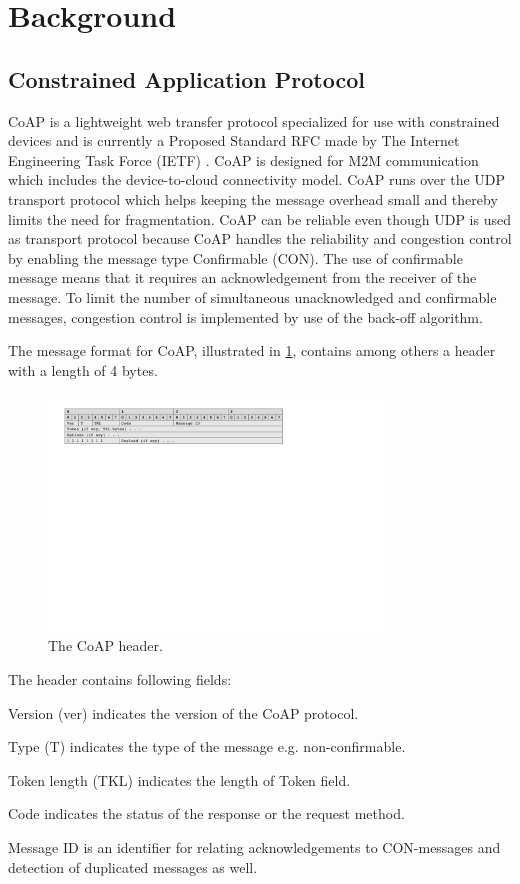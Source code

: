 \section{Background}\label{sec:background}

\subsection{Constrained Application Protocol}
CoAP is a lightweight web transfer protocol specialized for use with constrained devices and is currently a Proposed Standard RFC made by The Internet Engineering Task Force (IETF) \cite{Inter93:online}. CoAP is designed for M2M communication which includes the device-to-cloud connectivity model.
CoAP runs over the UDP transport protocol which helps keeping the message overhead small and thereby limits the need for fragmentation.
CoAP can be reliable even though UDP is used as transport protocol because CoAP handles the reliability and congestion control by enabling the message type Confirmable (CON). 
The use of confirmable message means that it requires an acknowledgement from the receiver of the message. 
To limit the number of simultaneous unacknowledged and confirmable messages, congestion control is implemented by use of the back-off algorithm.

The message format for CoAP, illustrated in \figurename{\ref{fig:msgformatcoap}}, contains among others a header with a length of 4 bytes. 
\begin{figure}[bht]
	\centering
	\includegraphics[width=3.5in]{gfx/msgformat-coap}
	\caption{The CoAP header.}
	\label{fig:msgformatcoap}
\end{figure}

The header contains following fields: 
\begin{list}{-}{}
	\item Version (ver) indicates the version of the CoAP protocol.
	\item Type (T) indicates the type of the message e.g. non-confirmable.
	\item Token length (TKL) indicates the length of Token field.
	\item Code indicates the status of the response or the request method. 
	\item Message ID is an identifier for relating acknowledgements to CON-messages and detection of duplicated messages as well.
\end{list}

